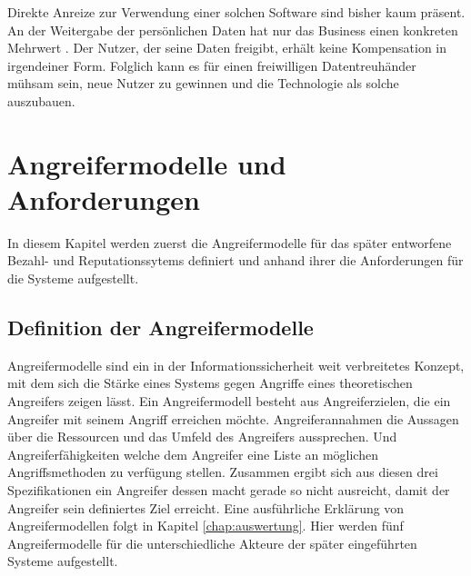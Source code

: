 \documentclass[
	fontsize=12pt,
	headings=small,
	parskip=half,           %
	bibliography=totoc,
	numbers=noenddot,       %
	open=any,               %
]{scrreprt}
\begin{document}
Direkte Anreize zur Verwendung einer solchen Software sind bisher kaum präsent. An der Weitergabe der persönlichen Daten hat nur das Business einen konkreten Mehrwert . Der Nutzer, der seine Daten freigibt, erhält keine Kompensation in irgendeiner Form. Folglich kann es für einen freiwilligen Datentreuhänder mühsam sein, neue Nutzer zu gewinnen und die Technologie als solche auszubauen.




\chapter{Angreifermodelle und Anforderungen}
In diesem Kapitel werden zuerst die Angreifermodelle für das später entworfene Bezahl- und Reputationssytems definiert und anhand ihrer die Anforderungen für die Systeme aufgestellt.
\label{chap:req}
\section{Definition der Angreifermodelle}
Angreifermodelle sind ein in der Informationssicherheit weit verbreitetes Konzept, mit dem sich die Stärke eines Systems gegen Angriffe eines theoretischen Angreifers zeigen lässt. Ein Angreifermodell besteht aus Angreiferzielen, die ein Angreifer mit seinem Angriff erreichen möchte. Angreiferannahmen die Aussagen über die Ressourcen und das Umfeld des Angreifers aussprechen. Und Angreiferfähigkeiten welche dem Angreifer eine Liste an möglichen Angriffsmethoden zu verfügung stellen. Zusammen ergibt sich aus diesen drei Spezifikationen ein Angreifer dessen macht gerade so nicht ausreicht, damit der Angreifer sein definiertes Ziel erreicht. Eine ausführliche Erklärung von Angreifermodellen folgt in Kapitel \ref{chap:auswertung}. Hier werden fünf Angreifermodelle für die unterschiedliche Akteure der später eingeführten Systeme aufgestellt.\\
\end{document}
